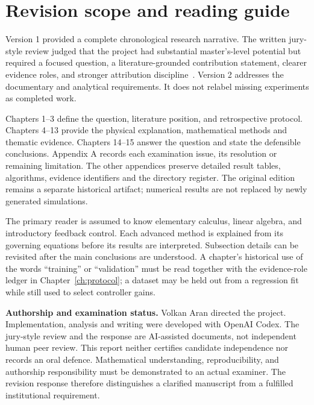 \chapter*{Revision scope and reading guide}
Version 1 provided a complete chronological research narrative. The written jury-style review judged that the project had substantial master's-level potential but required a focused question, a literature-grounded contribution statement, clearer evidence roles, and stronger attribution discipline~\cite{jury}. Version 2 addresses the documentary and analytical requirements. It does not relabel missing experiments as completed work.

Chapters 1--3 define the question, literature position, and retrospective protocol. Chapters 4--13 provide the physical explanation, mathematical methods and thematic evidence. Chapters 14--15 answer the question and state the defensible conclusions. Appendix A records each examination issue, its resolution or remaining limitation. The other appendices preserve detailed result tables, algorithms, evidence identifiers and the directory register. The original edition remains a separate historical artifact; numerical results are not replaced by newly generated simulations.

The primary reader is assumed to know elementary calculus, linear algebra, and introductory feedback control. Each advanced method is explained from its governing equations before its results are interpreted. Subsection details can be revisited after the main conclusions are understood. A chapter's historical use of the words ``training'' or ``validation'' must be read together with the evidence-role ledger in Chapter~\ref{ch:protocol}; a dataset may be held out from a regression fit while still used to select controller gains.

\textbf{Authorship and examination status.} Volkan Aran directed the project. Implementation, analysis and writing were developed with OpenAI Codex. The jury-style review and the response are AI-assisted documents, not independent human peer review. This report neither certifies candidate independence nor records an oral defence. Mathematical understanding, reproducibility, and authorship responsibility must be demonstrated to an actual examiner. The revision response therefore distinguishes a clarified manuscript from a fulfilled institutional requirement.
